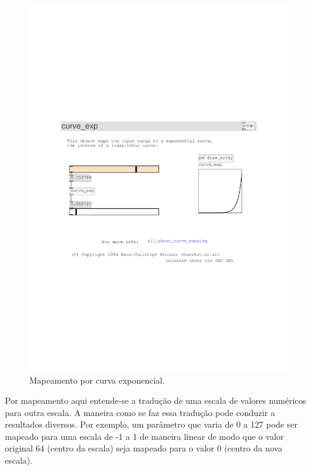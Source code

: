 \documentclass{ppgmus}
\begin{document}
\begin{figure}
\includegraphics[scale=.6]{mapping2}
\caption{Mapeamento por curva exponencial.}
\label{mapping2}
\end{figure}

Por mapeamento aqui entende-se a tradução de uma escala
de valores numéricos para outra escala. A maneira como
se faz essa tradução pode conduzir a resultados diversos.
Por exemplo, um parâmetro que varia de 0 a 127 pode ser 
mapeado para uma escala de -1 a 1 de maneira linear de modo
que o valor original 64 (centro da escala) seja mapeado para o valor 0 (centro
da nova escala).
\end{document}
